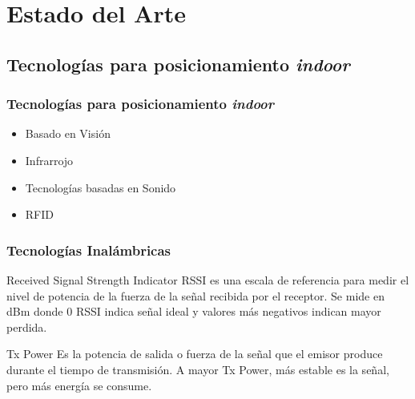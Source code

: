 \documentclass[handout]{beamer}
\begin{document}
\section{Estado del Arte}

\subsection{Tecnologías para posicionamiento \textit{indoor}}
\begin{frame}
\frametitle{Tecnologías para posicionamiento \textit{indoor}}

 
\begin{itemize}
\item Basado en Visión
\item Infrarrojo
\item Tecnologías basadas en Sonido
\item RFID
\end{itemize}

\end{frame}

\begin{frame}

\frametitle{Tecnologías Inalámbricas}

\begin{block}{Received Signal Strength Indicator}
RSSI es una escala de referencia para medir el nivel de potencia de la fuerza de la señal recibida por el receptor. Se mide en dBm donde 0 RSSI indica señal ideal y valores más negativos indican mayor perdida. 
\end{block}

\begin{block}{Tx Power}
Es la potencia de salida o fuerza de la señal que el emisor produce durante el tiempo de transmisión. A mayor Tx Power, más estable es la señal, pero más energía se consume.
\end{block}
\end{frame}

\end{document}
